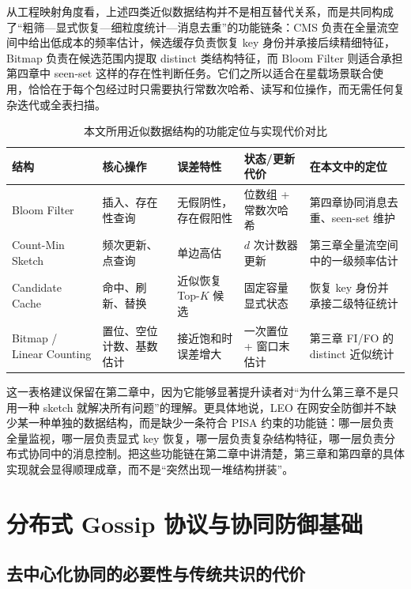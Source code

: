 
从工程映射角度看，上述四类近似数据结构并不是相互替代关系，而是共同构成了“粗筛—显式恢复—细粒度统计—消息去重”的功能链条：CMS 负责在全量流空间中给出低成本的频率估计，候选缓存负责恢复 key 身份并承接后续精细特征，Bitmap 负责在候选范围内提取 distinct 类结构特征，而 Bloom Filter 则适合承担第四章中 seen-set 这样的存在性判断任务。它们之所以适合在星载场景联合使用，恰恰在于每个包经过时只需要执行常数次哈希、读写和位操作，而无需任何复杂迭代或全表扫描。

\begin{table}[t]
\centering
\caption{本文所用近似数据结构的功能定位与实现代价对比}
\label{tab:ch2_ds_compare}
\small
\begin{tabular}{|p{2.6cm}|p{2.5cm}|p{2.3cm}|p{2.6cm}|p{3.5cm}|}
\hline
结构 & 核心操作 & 误差特性 & 状态/更新代价 & 在本文中的定位 \\
\hline
Bloom Filter & 插入、存在性查询 & 无假阴性，存在假阳性 & 位数组 + 常数次哈希 & 第四章协同消息去重、seen-set 维护 \\
\hline
Count-Min Sketch & 频次更新、点查询 & 单边高估 & $d$ 次计数器更新 & 第三章全量流空间中的一级频率估计 \\
\hline
Candidate Cache & 命中、刷新、替换 & 近似恢复 Top-$K$ 候选 & 固定容量显式状态 & 恢复 key 身份并承接二级特征统计 \\
\hline
Bitmap / Linear Counting & 置位、空位计数、基数估计 & 接近饱和时误差增大 & 一次置位 + 窗口末估计 & 第三章 FI/FO 的 distinct 近似统计 \\
\hline
\end{tabular}
\end{table}

这一表格建议保留在第二章中，因为它能够显著提升读者对“为什么第三章不是只用一种 sketch 就解决所有问题”的理解。更具体地说，LEO 在网安全防御并不缺少某一种单独的数据结构，而是缺少一条符合 PISA 约束的功能链：哪一层负责全量监视，哪一层负责显式 key 恢复，哪一层负责复杂结构特征，哪一层负责分布式协同中的消息控制。把这些功能链在第二章中讲清楚，第三章和第四章的具体实现就会显得顺理成章，而不是“突然出现一堆结构拼装”。

\section{分布式 Gossip 协议与协同防御基础}

\subsection{去中心化协同的必要性与传统共识的代价}

